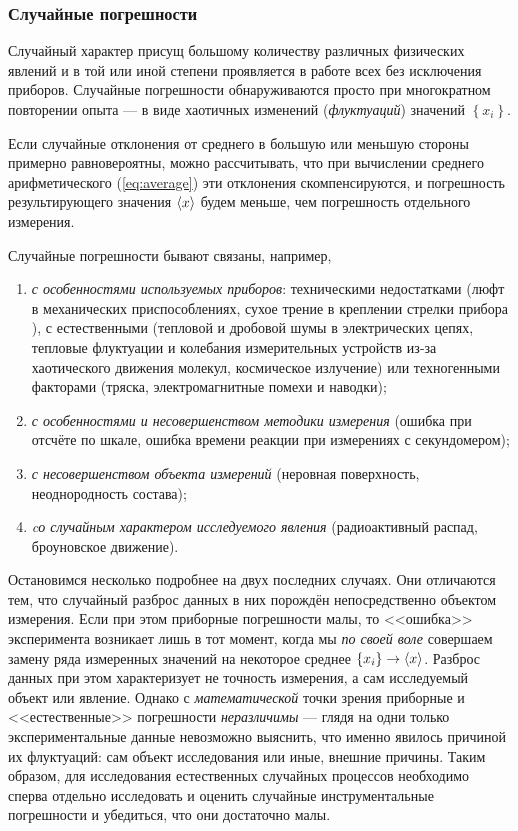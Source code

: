 \subsubsection{Случайные погрешности}

Случайный характер присущ большому количеству различных физических
явлений и в той или иной степени проявляется в работе всех без исключения
приборов. Случайные погрешности обнаруживаются просто при многократном
повторении опыта --- в виде хаотичных изменений (\emph{флуктуаций})
значений $\left\{ x_{i}\right\} $.

Если случайные отклонения от среднего в большую или меньшую стороны
примерно равновероятны, можно рассчитывать, что при вычислении среднего
арифметического (\ref{eq:average}) эти отклонения скомпенсируются,
и погрешность результирующего значения $\left<x\right>$ будем меньше,
чем погрешность отдельного измерения.

Случайные погрешности бывают связаны, например,
\begin{enumerate}

    \item \emph{с особенностями используемых приборов}: техническими недостатками
(люфт в механических приспособлениях, сухое трение в креплении стрелки
прибора ), с естественными (тепловой и дробовой шумы в электрических
цепях, тепловые флуктуации и колебания измерительных устройств из-за
хаотического движения молекул, космическое излучение) или техногенными
факторами (тряска, электромагнитные помехи и наводки);

    \item \emph{с особенностями и несовершенством методики измерения} (ошибка
при отсчёте по шкале, ошибка времени реакции при измерениях с секундомером);

    \item \emph{с несовершенством объекта измерений} (неровная поверхность,
неоднородность состава);

    \item \emph{cо случайным характером исследуемого явления} (радиоактивный
распад, броуновское движение).

\end{enumerate}

Остановимся несколько подробнее на двух последних случаях. Они отличаются
тем, что случайный разброс данных в них порождён непосредственно объектом
измерения. Если при этом приборные погрешности малы, то <<ошибка>>
эксперимента возникает лишь в тот момент, когда мы \emph{по своей
воле} совершаем замену ряда измеренных значений на некоторое среднее
$\left\{ x_{i}\right\} \to\left<x\right>$. Разброс данных при этом
характеризует не точность измерения, а сам исследуемый объект или
явление. Однако с \emph{математической} точки зрения приборные и <<естественные>>
погрешности \emph{неразличимы} --- глядя на одни только
экспериментальные данные невозможно выяснить, что именно явилось причиной
их флуктуаций: сам объект исследования или иные, внешние причины.
Таким образом, для исследования естественных случайных процессов необходимо
сперва отдельно исследовать и оценить случайные инструментальные погрешности
и убедиться, что они достаточно малы.

